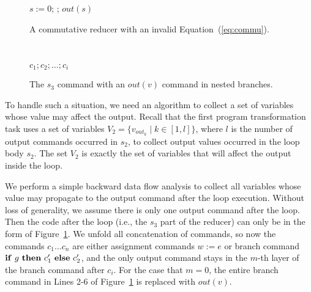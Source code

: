 \documentclass{llncs}
\newcommand{\cur}{cur()}
\newcommand{\ite}[3]{
	 \ifmmode
	 \mathbf{if}\ #1 \ \mathbf{then}\ #2\  \mathbf{else}\ #3
	 \else
	 \textbf{if}\ #1 \ \textbf{then}\ #2\  \textbf{else}\ #3
	 \fi}
\begin{document}
\begin{figure}[hbt]
	\begin{minipage}{0.4\textwidth}
		\begin{algorithm}[H]
			$s:= 0$; \;
			\Loop{}{
				$t:=\cur$;
				$s:= s + t$\;
			};
			$out(s)$\;\;\;
		\end{algorithm}
		\caption{A commutative reducer with an invalid Equation~(\ref{eq:commu}).}
		\label{fig:reducer_opt}
	\end{minipage}
	\ \ \ \ \ \ \ \
	\begin{minipage}{0.5\textwidth}
		\LinesNumbered
		\centering
		\begin{minipage}{0.75\textwidth}
		\begin{algorithm}[H]
			$c_1;c_2;\ldots;c_i$\;
			\lElse{ $\ldots$}
		\end{algorithm}
	\end{minipage}
		\caption{The $s_3$ command with an $out(v)$ command in nested branches.}
		\label{fig:nested_out}
	\end{minipage}
\end{figure}


To handle such a situation, we need an algorithm to collect a set of variables whose value may affect the output.
Recall that the first program transformation task uses a set of variables $V_2=\{v_{out_k} \mid k \in [1,l]\}$, where $l$ is the number of output commands occurred in $s_2$, to collect output values occurred in the loop body $s_2$.
The set $V_2$ is exactly the set of variables that will affect the output inside the loop.

We perform a simple backward data flow analysis to collect all variables whose value may propagate to the output command after the loop execution. Without loss of generality, we assume there is only one output command after the loop. Then the code after the loop (i.e., the $s_3$ part of the reducer) can only be in the form of Figure~\ref{fig:nested_out}.
We unfold all concatenation of commands, so now the commands $c_1\ldots c_n$ are either assignment commands $w:=e$ or branch command $\ite{g}{c'_1}{c'_2}$, and the only output command stays in the $m$-th layer of the branch command after $c_i$. For the case that $m=0$, the entire branch command in Lines 2-6 of Figure~\ref{fig:nested_out} is replaced with $out(v)$.
\end{document}
